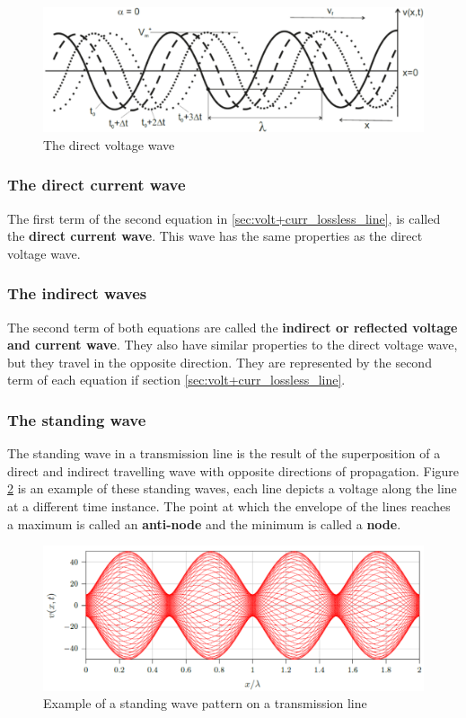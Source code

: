 \documentclass[../transmission.tex]{subfiles}
\begin{document}
				\begin{figure}[h]
					\centering
					\includegraphics[width=\linewidth]{../assets/chap02_lossless_direct_wave.png}
					\caption[The direct voltage wave]{The direct voltage wave}
					\label{fig:chap02losslessdirectwave}
				\end{figure}
			
			\subsubsection{The direct current wave}
				The first term of the second equation in \ref{sec:volt+curr_lossless_line}, is called the \textbf{direct current wave}. This wave has the same properties as the direct voltage wave. 
			
			\subsubsection{The indirect waves}
				The second term of both equations are called the \textbf{indirect or reflected voltage and current wave}. They also have similar properties to the direct voltage wave, but they travel in the opposite direction. They are represented by the second term of each equation if section \ref{sec:volt+curr_lossless_line}.
				
			\subsubsection{The standing wave}
				The standing wave in a transmission line is the result of the superposition of a direct and indirect travelling wave with opposite directions of propagation.  Figure \ref{fig:chap02_standing_wave} is an example of these standing waves, each line depicts a voltage along the line at a different time instance.  The point at which the envelope of the lines reaches a maximum is called an \textbf{anti-node} and the minimum is called a \textbf{node}.
				
				\begin{figure}[h]
					\centering
					\includegraphics[width=\linewidth]{../assets/chap02_standing_wave.png}
					\caption{Example of a standing wave pattern on a transmission line}
					\label{fig:chap02_standing_wave}
				\end{figure}
		
\end{document}

